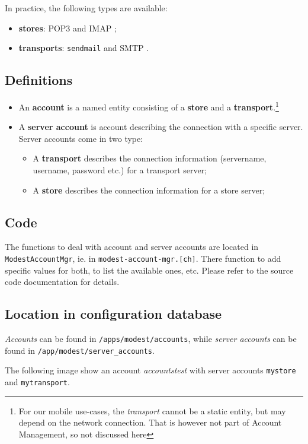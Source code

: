 \documentclass{book}
\newcommand{\smtp}{{\sc SMTP} }
\newcommand{\pop}{{\sc POP3} }
\newcommand{\imap}{{\sc IMAP} }
\begin{document}
In practice, the following types are available:
\begin{itemize}
  \item {\bf stores}: \pop and \imap;
  \item {\bf transports}: {\tt sendmail} and \smtp.
\end{itemize}

\subsection{Definitions}
\begin{itemize}
    \item An {\bf account} is a named entity consisting of a {\bf store} and a
    {\bf transport}.\footnote{For our mobile use-cases, the {\em transport}
      cannot be a static entity, but may depend on the network
      connection. That is however not part of Account Management, so not
      discussed here}
    \item  A {\bf server account} is account describing the connection with a
      specific server. Server accounts come in two type:
      \begin{itemize}
      \item A {\bf transport} describes the connection information (servername,
        username, password etc.) for a transport server;
      \item A {\bf store} describes the connection information for a store server;
      \end{itemize}
\end{itemize}

\subsection{Code}
The functions to deal with account and server accounts are located in {\tt
  ModestAccountMgr}, ie. in {\tt modest-account-mgr.[ch]}. There function to
add specific values for both, to list the available ones, etc. Please refer to
the source code documentation for details.

\subsection{Location in configuration database}
{\em Accounts} can be found in {\tt /apps/modest/accounts}, while {\em server
  accounts} can be found in {\tt /app/modest/server\_accounts}.

The following image show an account {\em accountstest} with server accounts
{\tt mystore} and {\tt mytransport}.
\end{document}
